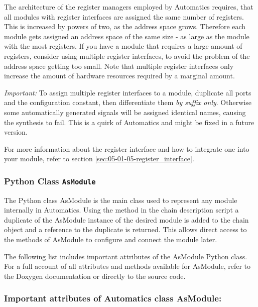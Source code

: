 The architecture of the register managers employed by Automatics requires, that all modules with register interfaces are assigned the same number of registers.
This is increased by powers of two, as the address space grows.
Therefore each module gets assigned an address space of the same size - as large as the module with the most registers.
If you have a module that requires a large amount of registers, consider using multiple register interfaces, to avoid the problem of the address space getting too small.
Note that multiple register interfaces only increase the amount of hardware resources required by a marginal amount.

\emph{Important:} To assign multiple register interfaces to a module, duplicate all ports and the configuration constant, then differentiate them \emph{by suffix only}. Otherwise some automatically generated signals will be assigned identical names, causing the synthesis to fail. This is a quirk of Automatics and might be fixed in a future version. 

For more information about the register interface and how to integrate one into your module, refer to section \ref{sec:05-01-05-register_interface}.

\subsubsection{Python Class \texttt{AsModule}}

The Python class AsModule is the main class used to represent any \asterics module internally in Automatics.
Using the method  in the chain description script a duplicate of the AsModule instance of the desired module is added to the chain object and a reference to the duplicate is returned.
This allows direct access to the methods of AsModule to configure and connect the module later.

The following list includes important attributes of the AsModule Python class.
For a full account of all attributes and methods available for AsModule, refer to the Doxygen documentation or directly to the source code.

\subsubsection*{Important attributes of Automatics class AsModule:}

